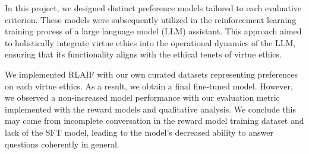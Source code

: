 In this project, we designed distinct preference models tailored to each evaluative criterion. These models were subsequently utilized in the reinforcement learning training process of a large language model (LLM) assistant. This approach aimed to holistically integrate virtue ethics into the operational dynamics of the LLM, ensuring that its functionality aligns with the ethical tenets of virtue ethics.

We implemented RLAIF with our own curated datasets representing preferences on each virtue ethics. As a result, we obtain a final fine-tuned model. However, we observed a non-increased model performance with our evaluation metric implemented with the reward models and qualitative analysis. We conclude this may come from incomplete conversation in the reward model training dataset and lack of the SFT model, leading to the model's decreased ability to answer questions coherently in general.